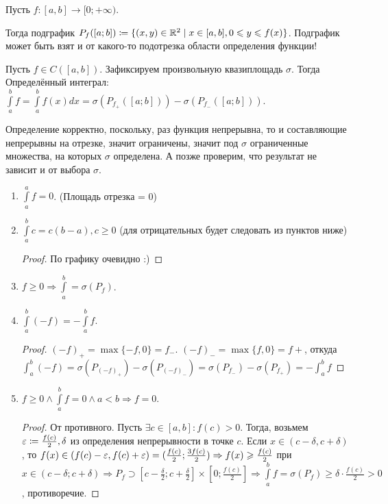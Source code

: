 \begin{definition}
	Пусть $f\!: [a, b] \to [0; +\infty)$.

    Тогда подграфик $P_f([a; b]) \coloneqq \{(x, y) \in \mathbb{R}^2 \mid x \in [a, b], 0 \leqslant y \leqslant f(x)\}$.
    Подграфик может быть взят и от какого-то подотрезка области определения функции!
\end{definition}
\begin{definition}
    Пусть $f \in C([a, b])$. Зафиксируем произвольную квазиплощадь $\sigma$. Тогда
    Определённый интеграл: $\int\limits_a^b f = \int\limits_a^b f(x) dx = \sigma(P_{f_+}([a; b])) - \sigma(P_{f_-}([a; b]))$.

    Определение корректно, поскольку, раз функция непрерывна, то и составляющие непрерывны на отрезке, значит ограничены, значит под $\sigma$ ограниченные множества, на которых $\sigma$ определена. А позже проверим, что результат не зависит и от выбора $\sigma$.
\end{definition}
\begin{properties}
    \begin{enumerate}
    \item $\int\limits_a^a f = 0$. (Площадь отрезка = 0)
	\item $\int\limits_a^b c = c(b-a), c \ge 0$ (для отрицательных будет следовать из пунктов ниже)
            \begin{proof}
                По графику очевидно :)
            \end{proof}
        \item $f \ge 0 \Rightarrow \int\limits_a^b = \sigma(P_f)$.
        \item $\int\limits_a^b (-f) = -\int\limits_a^b f$.
             \begin{proof}
		     $(-f)_+ = \max\{-f, 0\} = f_-$.  $(-f)_- = \max\{f, 0\} = f+$, откуда $\int_a^b (-f) = \sigma(P_{(-f)_+}) - \sigma(P_{(-f)_-}) = \sigma(P_{f_-}) - \sigma(P_{f_+}) = -\int_a^b f$
            \end{proof}
        \item $f \ge 0 \land \int\limits_a^b f = 0 \land a < b \Rightarrow f = 0$.
            \begin{proof}
                От противного. Пусть $\exists c \in [a, b]\!: f(c) > 0$. Тогда, возьмем $\varepsilon \coloneqq \frac{f(c)}{2}, \delta$ из определения непрерывности в точке $c$. Если  $x \in (c - \delta, c + \delta)$, то  $f(x) \in (f(c) - \varepsilon, f(c) + \varepsilon) = (\frac{f(c)}{2}; \frac{3f(c)}{2}) \Rightarrow f(x) \geqslant \frac{f(c)}{2}$ при $x \in (c - \delta; c + \delta) \Rightarrow P_f \supset [c-\frac{\delta}{2}; c + \frac{\delta}{2}]\times[0; \frac{f(c)}{2}] \Rightarrow \int\limits_a^b f = \sigma(P_f) \ge \delta \cdot \frac{f(c)}{2} > 0$, противоречие.
            \end{proof}
    \end{enumerate}
\end{properties}
